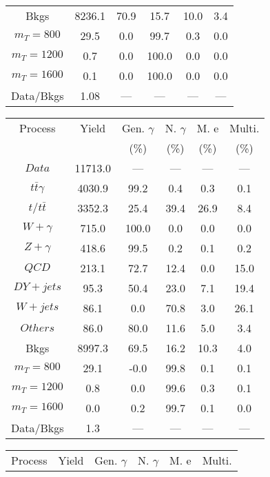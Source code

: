 \begin{figure}
\begin{minipage}[c]{0.32\textwidth}
{\begin{tabular}{cccccc}
Bkgs &  8236.1 &  70.9 &  15.7 &  10.0 &  3.4\\
$ m_{T} = 800 $ &  29.5 &  0.0 &  99.7 &  0.3 &  0.0\\
$ m_{T} = 1200 $ &  0.7 &  0.0 &  100.0 &  0.0 &  0.0\\
$ m_{T} = 1600 $ &  0.1 &  0.0 &  100.0 &  0.0 &  0.0\\
Data/Bkgs &  1.08 &  --- &  --- &  --- &  ---\\
\hline
\end{tabular}
}
\end{minipage}
\begin{minipage}[c]{0.32\textwidth}
\centering
\tiny{
\begin{tabular}{cccccc}
\hline
Process & Yield & Gen. $\gamma$ & N. $\gamma$ & M. e & Multi. \\
 &  & (\%) & (\%) & (\%) & (\%)  \\
\hline
                                                                      $ Data $ &  11713.0 &  --- &  --- &  --- &  ---\\
$ t\bar{t}\gamma $ &  4030.9 &  99.2 &  0.4 &  0.3 &  0.1\\
$ t/t\bar{t} $ &  3352.3 &  25.4 &  39.4 &  26.9 &  8.4\\
$ W+\gamma $ &  715.0 &  100.0 &  0.0 &  0.0 &  0.0\\
$ Z+\gamma $ &  418.6 &  99.5 &  0.2 &  0.1 &  0.2\\
$ QCD $ &  213.1 &  72.7 &  12.4 &  0.0 &  15.0\\
$ DY+jets $ &  95.3 &  50.4 &  23.0 &  7.1 &  19.4\\
$ W+jets $ &  86.1 &  0.0 &  70.8 &  3.0 &  26.1\\
$ Others $ &  86.0 &  80.0 &  11.6 &  5.0 &  3.4\\
Bkgs &  8997.3 &  69.5 &  16.2 &  10.3 &  4.0\\
$ m_{T} = 800 $ &  29.1 &  -0.0 &  99.8 &  0.1 &  0.1\\
$ m_{T} = 1200 $ &  0.8 &  0.0 &  99.6 &  0.3 &  0.1\\
$ m_{T} = 1600 $ &  0.0 &  0.2 &  99.7 &  0.1 &  0.0\\
Data/Bkgs &  1.3 &  --- &  --- &  --- &  ---\\
\hline
\end{tabular}
}
\end{minipage}
\begin{minipage}[c]{0.32\textwidth}
\centering
\tiny{
\begin{tabular}{cccccc}
\hline
Process & Yield & Gen. $\gamma$ & N. $\gamma$ & M. e & Multi. \\

\end{tabular}}
\end{minipage}
\end{figure}
